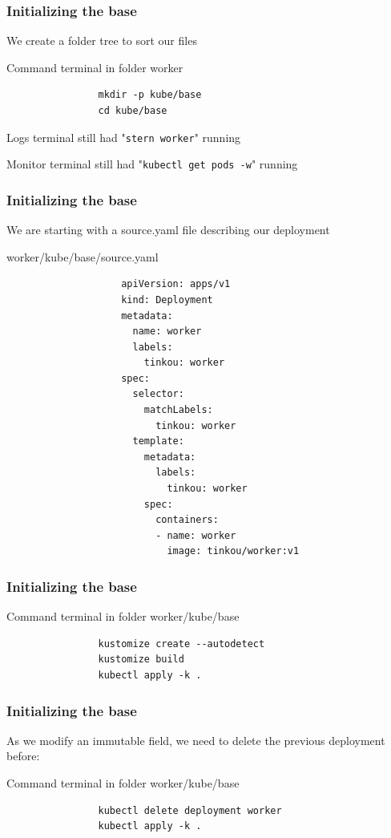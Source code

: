 	\begin{frame}[fragile]
		\frametitle{Initializing the base}
		
		We create a folder tree to sort our files
		\begin{block}{Command terminal in folder worker}
			\begin{verbatim}
				mkdir -p kube/base
				cd kube/base
			\end{verbatim}
		\end{block}
		
		\bigskip
		
		\begin{footnotesize}
			Logs terminal still had "\verb!stern worker!" running
			
			Monitor terminal still had "\verb!kubectl get pods -w!" running
		\end{footnotesize}
	\end{frame}
	
	\begin{frame}[fragile]
		\frametitle{Initializing the base}
		
		We are starting with a source.yaml file describing our deployment
		\begin{block}{worker/kube/base/source.yaml}
			\begin{tiny}
				\begin{verbatim}
					apiVersion: apps/v1
					kind: Deployment
					metadata:
					  name: worker
					  labels:
					    tinkou: worker
					spec:
					  selector:
					    matchLabels:
					      tinkou: worker
					  template:
					    metadata:
					      labels:
					        tinkou: worker
					    spec:
					      containers:
					      - name: worker
					        image: tinkou/worker:v1
				\end{verbatim}
			\end{tiny}
		\end{block}
	\end{frame}
	
	\begin{frame}[fragile]
		\frametitle{Initializing the base}
		\begin{block}{Command terminal in folder worker/kube/base}
			\begin{verbatim}
				kustomize create --autodetect
				kustomize build
				kubectl apply -k .
			\end{verbatim}
		\end{block}
	\end{frame}
	
	\begin{frame}[fragile]
		\frametitle{Initializing the base}
		As we modify an immutable field, we need to delete the previous deployment before:
		\begin{block}{Command terminal in folder worker/kube/base}
			\begin{verbatim}
				kubectl delete deployment worker
				kubectl apply -k .
			\end{verbatim}
		\end{block}
	\end{frame}
	
